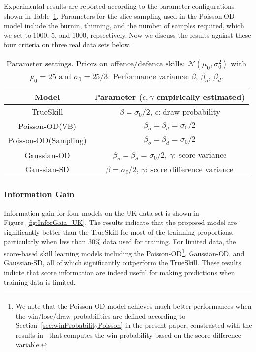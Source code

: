 Experimental results are reported according to the parameter
configurations shown in Table~\ref{table:Parameters}. Parameters for the slice sampling used in the Poisson-OD model include the burnin, thinning, and the number of samples required, which we set to 1000, 5, and 1000, repsectively. 
Now we discuss the results against these four criteria on three real data sets below. 
\begin{table}[htbp!]
\caption{Parameter settings. Priors on offence/defence skills: $\mathcal{N}(\mu_{0},\sigma_{0}^2)$ with $\mu_{0}=25$ and $\sigma_{0}=25/3$. Performance variance: $\beta$, $\beta_o$, $\beta_d$.}
\begin{center}
\small
\begin{tabular}{cc}
  \hline
  Model             & Parameter ($\epsilon,\gamma$ empirically estimated)\\
  \hline
  TrueSkill          & $\beta=\sigma_{0}/2$, $\epsilon$: draw probability\\
  Poisson-OD(VB)         & $\beta_o=\beta_d=\sigma_{0}/2$\\
  Poisson-OD(Sampling)         & $\beta_o=\beta_d=\sigma_{0}/2$\\
  Gaussian-OD    & $\beta_o=\beta_d=\sigma_{0}/2$, $\gamma$: score variance\\
  Gaussian-SD & $\beta=\sigma_{0}/2$, $\gamma$: score difference variance\\
  \hline
\end{tabular}
\label{table:Parameters}
\end{center}
\end{table}

\subsubsection{Information Gain}
Information gain for four models on the UK data set is shown in Figure~\ref{fig:InforGain_UK}. The results indicate that the proposed model are significantly better than the TrueSkill for most of the trainning proportions, particularly when less than 30\% data used for training. For limited data, the score-based skill learning models including the Poisson-OD\footnote{We note that the Poisson-OD model achieves much better performances when the win/lose/draw probabilities  are defined according to Section~\ref{sec:winProbabilityPoisson} in the present paper, constrasted with the results in~\cite{Guo:ECML2012} that computes the win probability based on the score difference variable.}, Gaussian-OD, and Gaussian-SD, all of which significantly outperform the TrueSkill. These results indicte that score information are indeed useful for making predictions when training data is limited. 

